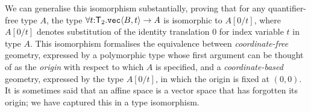 We can generalise this isomorphism substantially, proving
that for any quantifier-free type $A$, 
the type $\forall t\mathord:\mathsf{T}_2.\textup{\texttt{vec}}\langle B,t \rangle\to A$
is isomorphic to $A[0/t]$, where $A[0/t]$ 
denotes substitution of the identity translation $0$
for index variable $t$ in type $A$. This isomorphism formalises the
equivalence between \emph{coordinate-free} geometry, expressed by a
polymorphic type whose first argument can be thought of as the
\emph{origin} with respect to which $A$ is specified, and a
\emph{coordinate-based} geometry, expressed by the type $A[0/t]$, in
which the origin is fixed at $(0,0)$. It is sometimes said that an
affine space is a vector space that has forgotten its origin; we have
captured this in a type isomorphism.

\newcommand{\transup}[3]{\mathord\uparrow_{#1}^{#2\mathord:#3}}
\newcommand{\transdn}[3]{\mathord\downarrow_{#1}^{#2\mathord:#3}}
\newcommand{\transtrans}[3]{\mathrm{tr}_{#1}^{#2\mathord:#3}}

